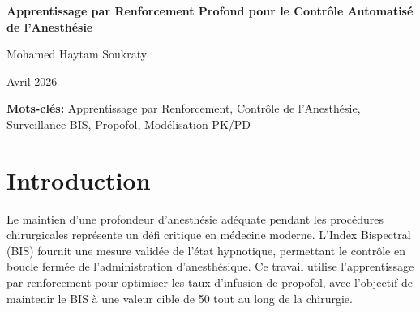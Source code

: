 \documentclass[12pt,a4paper]{article}
\begin{document}
\begin{titlepage}
    \centering
    \vspace*{2cm}
    
    {\LARGE\bfseries Apprentissage par Renforcement Profond pour le Contrôle Automatisé de l'Anesthésie\par}
    \vspace{1.5cm}
    
    {\Large Mohamed Haytam Soukraty\par}
    \vspace{0.5cm}
    
    {\large Avril 2026\par}
    \vspace{2cm}
    
    \begin{abstract}
        \noindent
        Ce travail présente quatre approches d'apprentissage par renforcement pour l'administration automatisée de propofol pendant la chirurgie, utilisant la surveillance BIS et les simulations PK/PD. Les algorithmes vont des méthodes tabulaires (Q-Learning, Programmation Dynamique) au RL profond (DQN), tous opérant sur une représentation floue de la dynamique d'erreur du BIS. Nos résultats indiquent que tous les modèles nécessitent un entraînement supplémentaire pour atteindre une performance cliniquement acceptable, avec Q-Learning montrant le sous-entraînement le plus sévère et les méthodes basées sur la programmation dynamique démontrant une instabilité de contrôle modérée.
    \end{abstract}
    
    \vspace{1.5cm}
    \textbf{Mots-clés:} Apprentissage par Renforcement, Contrôle de l'Anesthésie, Surveillance BIS, Propofol, Modélisation PK/PD
    
\end{titlepage}

\newpage

\section{Introduction}

Le maintien d'une profondeur d'anesthésie adéquate pendant les procédures chirurgicales représente un défi critique en médecine moderne. L'Index Bispectral (BIS) fournit une mesure validée de l'état hypnotique, permettant le contrôle en boucle fermée de l'administration d'anesthésique. Ce travail utilise l'apprentissage par renforcement pour optimiser les taux d'infusion de propofol, avec l'objectif de maintenir le BIS à une valeur cible de 50 tout au long de la chirurgie.
\end{document}
